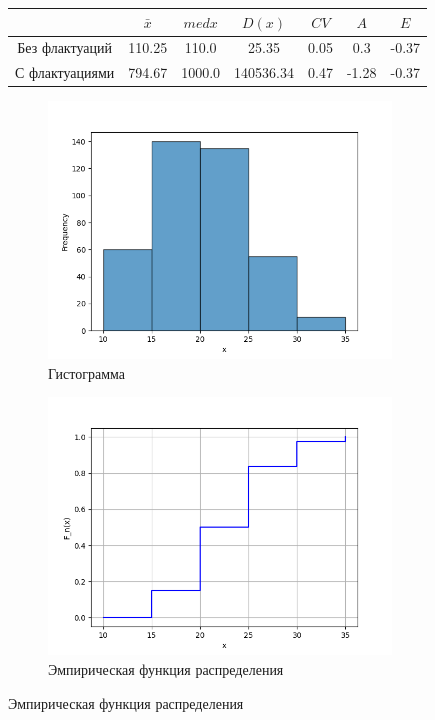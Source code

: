 \documentclass[12pt,a4paper]{article}
\begin{document}
\begin{figure}
		\begin{subtable}[htbp!]{0.8\textwidth}
			\centering
			\begin{tabular}{ |c|c|c|c|c|c|c| }
				\hline
				& \( \bar x \) & \( med x \) & \( D(x) \) & \( CV \) & \( A \) & \( E \) \\
				\hline
				Без флактуаций & 110.25 & 110.0 & 25.35 & 0.05 & 0.3 & -0.37 \\
				\hline
				С флактуациями & 794.67 & 1000.0 & 140536.34 & 0.47 & -1.28 & -0.37 \\
				\hline
			\end{tabular}
		\end{subtable}
	\end{figure}

	\begin{figure}
		\begin{subfigure}[htbp!]{0.8\textwidth}
			\begin{center}
				\includegraphics[width = 0.8\linewidth]{../graphics/4_hist.png}
				\caption{Гистограмма}
			\end{center}
		\end{subfigure}

		\begin{subfigure}[htbp!]{0.8\textwidth}
			\begin{center}
				\includegraphics[width = 0.8\linewidth]{../graphics/4_cdf.png}
				\caption{Эмпирическая функция распределения}
			\end{center}
		\end{subfigure}


\end{figure}
\end{document}
